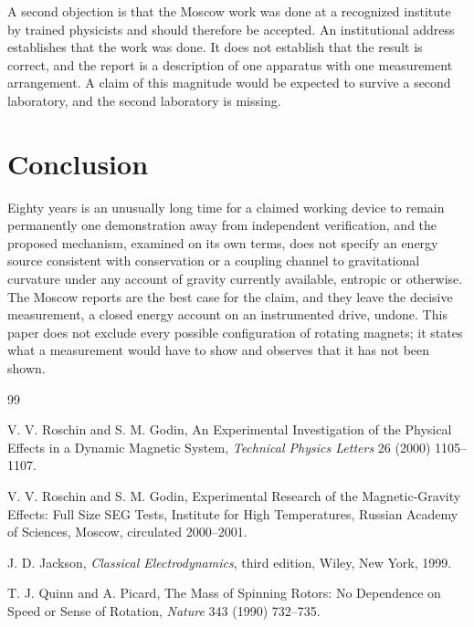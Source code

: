 \documentclass[11pt]{article}
\begin{document}
A second objection is that the Moscow work was done at a recognized institute by trained physicists and should therefore be accepted. An institutional address establishes that the work was done. It does not establish that the result is correct, and the report is a description of one apparatus with one measurement arrangement. A claim of this magnitude would be expected to survive a second laboratory, and the second laboratory is missing.

\section{Conclusion}

Eighty years is an unusually long time for a claimed working device to remain permanently one demonstration away from independent verification, and the proposed mechanism, examined on its own terms, does not specify an energy source consistent with conservation or a coupling channel to gravitational curvature under any account of gravity currently available, entropic or otherwise. The Moscow reports are the best case for the claim, and they leave the decisive measurement, a closed energy account on an instrumented drive, undone. This paper does not exclude every possible configuration of rotating magnets; it states what a measurement would have to show and observes that it has not been shown.

\begin{thebibliography}{99}

 V. V. Roschin and S. M. Godin, An Experimental Investigation of the Physical Effects in a Dynamic Magnetic System, \emph{Technical Physics Letters} 26 (2000) 1105--1107.

 V. V. Roschin and S. M. Godin, Experimental Research of the Magnetic-Gravity Effects: Full Size SEG Tests, Institute for High Temperatures, Russian Academy of Sciences, Moscow, circulated 2000--2001.

 J. D. Jackson, \emph{Classical Electrodynamics}, third edition, Wiley, New York, 1999.

 T. J. Quinn and A. Picard, The Mass of Spinning Rotors: No Dependence on Speed or Sense of Rotation, \emph{Nature} 343 (1990) 732--735.

\end{thebibliography}
\end{document}
